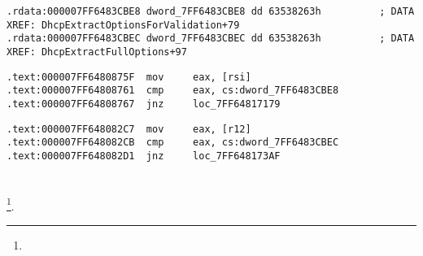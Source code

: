\begin{lstlisting}[caption=dhcpcore.dll (Windows 7 x64)]
.rdata:000007FF6483CBE8 dword_7FF6483CBE8 dd 63538263h          ; DATA XREF: DhcpExtractOptionsForValidation+79
.rdata:000007FF6483CBEC dword_7FF6483CBEC dd 63538263h          ; DATA XREF: DhcpExtractFullOptions+97
\end{lstlisting}


\begin{lstlisting}[caption=dhcpcore.dll (Windows 7 x64)]
.text:000007FF6480875F  mov     eax, [rsi]
.text:000007FF64808761  cmp     eax, cs:dword_7FF6483CBE8
.text:000007FF64808767  jnz     loc_7FF64817179
\end{lstlisting}


\begin{lstlisting}[caption=dhcpcore.dll (Windows 7 x64)]
.text:000007FF648082C7  mov     eax, [r12]
.text:000007FF648082CB  cmp     eax, cs:dword_7FF6483CBEC
.text:000007FF648082D1  jnz     loc_7FF648173AF
\end{lstlisting}

\section{}

%
\footnote{\BGREPURL}.
